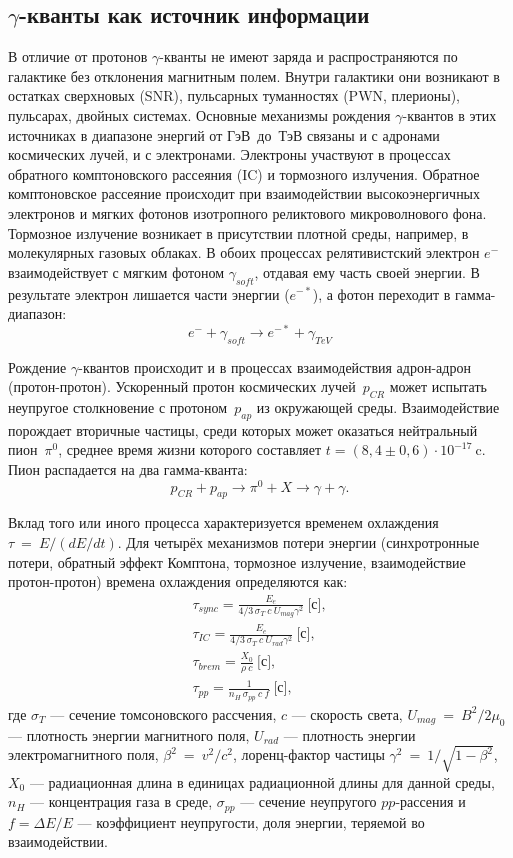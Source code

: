 \documentclass[magd,floatypics,numeref]{msudipl} %
\begin{document}
\subsection{$\gamma$-кванты как источник информации}
В отличие от протонов $\gamma$-кванты не имеют заряда и распространяются по галактике без отклонения магнитным полем. Внутри галактики они возникают в остатках сверхновых (SNR), пульсарных туманностях (PWN, плерионы), пульсарах, двойных системах. 
Основные механизмы рождения $\gamma$-квантов в этих источниках в диапазоне энергий от ГэВ~до~ТэВ связаны и с адронами космических лучей, и с электронами. Электроны участвуют в процессах обратного комптоновского рассеяния (IC) и тормозного излучения. Обратное комптоновское рассеяние происходит при взаимодействии высокоэнергичных электронов и мягких фотонов изотропного реликтового микроволнового фона. Тормозное излучение возникает в присутствии плотной среды, например, в молекулярных газовых облаках. В обоих процессах релятивистский электрон $e^-$ взаимодействует с мягким фотоном $\gamma_{soft}$, отдавая ему часть своей энергии. В результате электрон лишается части энергии ($e^{-*}$), а фотон переходит в гамма-диапазон:
\begin{equation}
e^- + \gamma_{soft} \rightarrow e^{-*} + \gamma_{TeV}
\end{equation}

Рождение $\gamma$-квантов происходит и в процессах взаимодействия адрон-адрон (протон-протон). Ускоренный протон космических лучей~$p_{CR}$ может испытать неупругое столкновение с протоном~$p_{ap}$ из окружающей среды. Взаимодействие порождает вторичные частицы, среди которых может оказаться нейтральный пион~$\pi^0$, среднее время жизни которого составляет $t=(8,4\pm0,6)\cdot10^{-17}~$c. Пион распадается на два гамма-кванта:
\begin{equation}
p_{CR}+p_{ap}\rightarrow\pi^0+X\rightarrow \gamma+\gamma.
\end{equation}

Вклад того или иного процесса характеризуется временем охлаждения $\tau~=~E/(dE/dt)$. Для четырёх механизмов потери энергии (синхротронные потери, обратный эффект Комптона, тормозное излучение, взаимодействие протон-протон) времена охлаждения определяются как:
\begin{align}
\tau_{sync} = \frac{E_e}{4/3 \,\sigma_T~c~U_{mag} \gamma^2}~\text{[с]}, \\
\tau_{IC} = \frac{E_e}{4/3 \,\sigma_T ~c~U_{rad}   \gamma^2}~\text{[с]}, \\
\tau_{brem} = \frac{X_0}{\rho~c}~\text{[с]}, \\
\tau_{pp} = \frac{1}{n_H \,\sigma_{pp}~c~f}~\text{[с]},
\end{align}
где $\sigma_T$ --- сечение томсоновского рассчения, $c$ --- скорость света,  $U_{mag}~=~B^2/2\mu_0$ --- плотность энергии магнитного поля, $U_{rad}$ --- плотность энергии электромагнитного поля, $\beta^2~=~v^2/c^2$, лоренц-фактор частицы $\gamma^2~=~1/\sqrt{1-\beta^2}$, $X_0$ --- радиационная длина в единицах радиационной длины для данной среды, $n_H$ --- концентрация газа в среде, $\sigma_{pp}$ --- сечение неупругого $pp$-рассения и $f = \Delta E/E$ --- коэффициент неупругости, доля энергии, теряемой во взаимодействии. 
\end{document}
